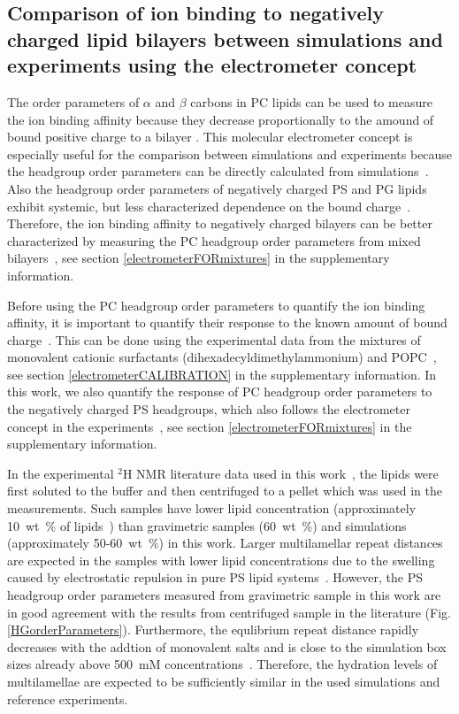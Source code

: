 \documentclass[aps,prl,superscriptaddress,twocolumn]{revtex4}
\begin{document}
\subsection{Comparison of ion binding to negatively charged lipid bilayers 
between simulations and experiments using the electrometer concept}

The order parameters of $\alpha$ and $\beta$ carbons in PC lipids
can be used to measure the ion binding affinity because they 
decrease proportionally to the amound of bound positive
charge to a bilayer \cite{akutsu81,altenbach84,seelig87}.
This molecular electrometer concept is especially useful for 
the comparison between simulations and experiments because
the headgroup order parameters can be directly calculated from 
simulations~\cite{catte16}. Also the headgroup order parameters
of negatively charged PS and PG lipids exhibit systemic, but less
characterized dependence on the bound charge~\cite{borle85,macdonald87,roux86,roux90}.
Therefore, the ion binding affinity to negatively charged bilayers
can be better characterized by measuring the PC headgroup order parameters from 
mixed bilayers~\cite{roux86,roux90,roux91}, see section \ref{electrometerFORmixtures} in the supplementary information.

Before using the PC headgroup order parameters to quantify the ion binding
affinity, it is important to quantify their response to the known amount of bound charge~\cite{catte16,melcr18}.
This can be done using the experimental data from the mixtures of
monovalent cationic surfactants (dihexadecyldimethylammonium) and POPC~\cite{scherer89,melcr18},
see section \ref{electrometerCALIBRATION} in the supplementary information.
In this work, we also quantify the response of PC headgroup order parameters
to the negatively charged PS headgroups, which also follows the electrometer
concept in the experiments~\cite{scherer87},
see section \ref{electrometerFORmixtures} in the supplementary information.

In the experimental $^2$H NMR literature data used in this work~\cite{browning80,roux90},
the lipids were first soluted to the buffer and then centrifuged to a pellet which
was used in the measurements. Such samples have lower lipid concentration
(approximately 10~wt~\% of lipids~\cite{browning80,roux88,roux90}) than 
gravimetric samples (60~wt~\%) and simulations (approximately 50-60~wt~\%) in this work.
Larger multilamellar repeat distances are expected in the samples with lower lipid
concentrations due to the swelling caused by electrostatic repulsion in pure PS lipid systems~\cite{millman82}.
However, the PS headgroup order parameters measured from gravimetric sample in this work
are in good agreement with the results from centrifuged sample in the literature \cite{browning80} (Fig. \ref{HGorderParameters}).
Furthermore, the equlibrium repeat distance rapidly decreases with the addtion of monovalent
salts and is close to the simulation box sizes already above 500~mM concentrations~\cite{millman82,rand89}.
Therefore, the hydration levels of multilamellae are expected to be sufficiently similar
in the used simulations and reference experiments.
\end{document}
